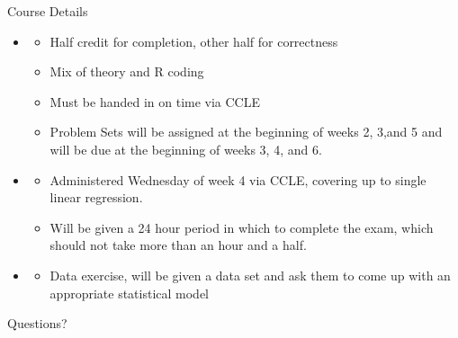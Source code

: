 \documentclass[notheorems,9pt]{beamer}
\begin{document}
\begin{frame}{Course Details} 
	\begin{itemize}
		\item<1-> 
		\begin{itemize}
			\item Half credit for completion, other half for correctness
			\item Mix of theory and R coding
			\item Must be handed in on time via CCLE
			\item Problem Sets will be assigned at the beginning of weeks 2, 3,and 5 and will be due at the beginning of weeks 3, 4, and 6.
		\end{itemize}
		\item<2-> 
		\begin{itemize}
			\item Administered Wednesday of week 4 via CCLE, covering up to single linear regression.
			\item Will be given a 24 hour period in which to complete the exam, which should not take more than an hour and a half.
		\end{itemize}
		\item<3-> 
		\begin{itemize}
			\item Data exercise, will be given a data set and ask them to come up with an appropriate statistical model
		\end{itemize}
	\end{itemize}
\end{frame}

\begin{frame}{Questions?} 
	\centering{} 
\end{frame}
\end{document}

